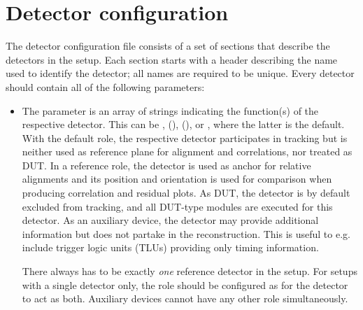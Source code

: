 \section{Detector configuration}
\label{sec:detector_config}
The detector configuration file consists of a set of sections that describe the detectors in the setup.
Each section starts with a header describing the name used to identify the detector; all names are required to be unique.
Every detector should contain all of the following parameters:
\begin{itemize}
\item The  parameter is an array of strings indicating the function(s) of the respective detector. This can be ,  (),  (), or , where the latter is the default. With the default role, the respective detector participates in tracking but is neither used as reference plane for alignment and correlations, nor treated as DUT. In a reference role, the detector is used as anchor for relative alignments and its position and orientation is used for comparison when producing correlation and residual plots. As DUT, the detector is by default excluded from tracking, and all DUT-type modules are executed for this detector. As an auxiliary device, the detector may provide additional information but does not partake in the reconstruction. This is useful to e.g. include trigger logic units (TLUs) providing only timing information.
\begin{warning}
There always has to be exactly \emph{one} reference detector in the setup. For setups with a single detector only, the role should be configured as  for the detector to act as both. Auxiliary devices cannot have any other role simultaneously.
\end{warning}


\end{itemize}
